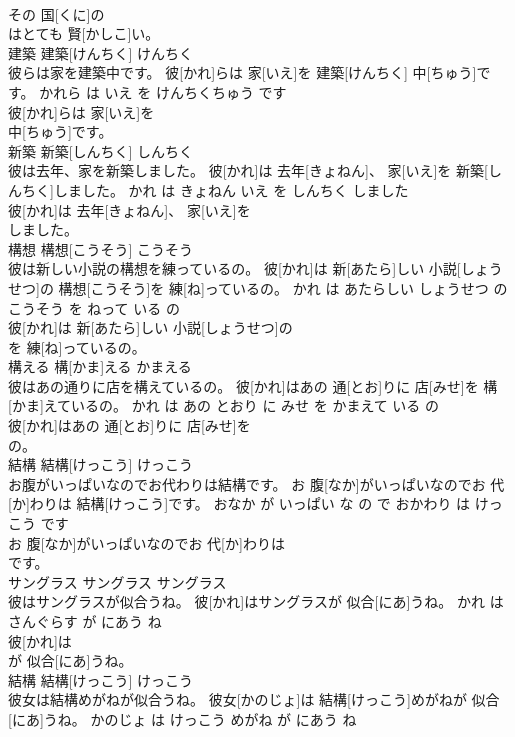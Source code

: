 \documentclass[8pt]{extreport}
\begin{document}
\begin{CJK}{UTF8}{min}
\\	その 国[くに]の
\\	はとても 賢[かしこ]い。			
\\	建築	建築[けんちく]	けんちく	
\\	彼らは家を建築中です。	彼[かれ]らは 家[いえ]を 建築[けんちく] 中[ちゅう]です。	かれら は いえ を けんちくちゅう です	
\\	彼[かれ]らは 家[いえ]を
\\	中[ちゅう]です。			
\\	新築	新築[しんちく]	しんちく	
\\	彼は去年、家を新築しました。	彼[かれ]は 去年[きょねん]、 家[いえ]を 新築[しんちく]しました。	かれ は きょねん いえ を しんちく しました	
\\	彼[かれ]は 去年[きょねん]、 家[いえ]を
\\	しました。			
\\	構想	構想[こうそう]	こうそう	
\\	彼は新しい小説の構想を練っているの。	彼[かれ]は 新[あたら]しい 小説[しょうせつ]の 構想[こうそう]を 練[ね]っているの。	かれ は あたらしい しょうせつ の こうそう を ねって いる の	
\\	彼[かれ]は 新[あたら]しい 小説[しょうせつ]の
\\	を 練[ね]っているの。			
\\	構える	構[かま]える	かまえる	
\\	彼はあの通りに店を構えているの。	彼[かれ]はあの 通[とお]りに 店[みせ]を 構[かま]えているの。	かれ は あの とおり に みせ を かまえて いる の	
\\	彼[かれ]はあの 通[とお]りに 店[みせ]を
\\	の。			
\\	結構	結構[けっこう]	けっこう	
\\	お腹がいっぱいなのでお代わりは結構です。	お 腹[なか]がいっぱいなのでお 代[か]わりは 結構[けっこう]です。	おなか が いっぱい な の で おかわり は けっこう です	
\\	お 腹[なか]がいっぱいなのでお 代[か]わりは
\\	です。			
\\	サングラス	サングラス	サングラス	
\\	彼はサングラスが似合うね。	彼[かれ]はサングラスが 似合[にあ]うね。	かれ は さんぐらす が にあう ね	
\\	彼[かれ]は
\\	が 似合[にあ]うね。			
\\	結構	結構[けっこう]	けっこう	
\\	彼女は結構めがねが似合うね。	彼女[かのじょ]は 結構[けっこう]めがねが 似合[にあ]うね。	かのじょ は けっこう めがね が にあう ね	

\end{CJK}
\end{document}
